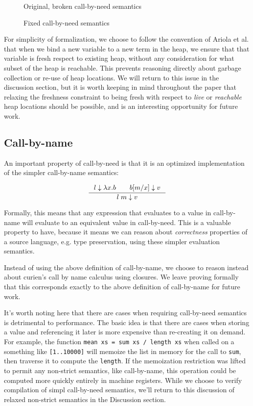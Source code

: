 \begin{figure}

\caption{Original, broken call-by-need semantics}
\label{fig:cbnbroken}
\end{figure}

\begin{figure}

\caption{Fixed call-by-need semantics}
\label{fig:cbnfixed}
\end{figure}

For simplicity of formalization, we choose to follow the convention of Ariola et
al. that when we bind a new variable to a new term in the heap, we ensure that
that variable is fresh respect to existing heap, without any consideration for
what subset of the heap is reachable. This prevents reasoning directly about
garbage collection or re-use of heap locations. We will return to this issue in
the discussion section, but it is worth keeping in mind throughout the paper
that relaxing the freshness constraint to being fresh with respect to
\emph{live} or \emph{reachable} heap locations should be possible, and is an
interesting opportunity for future work. 

\subsection{Call-by-name}
An important property of call-by-need is that it is an optimized implementation of
the simpler call-by-name semantics: 

\begin{align}
\inference{l \downarrow \lambda x. b \quad \quad b [m / x] \downarrow v}{l \; m \downarrow v}
\end{align}

Formally, this means that any expression that evaluates to a value in
call-by-name will evaluate to an equivalent value in call-by-need. This is a
valuable property to have, because it means we can reason about
\emph{correctness} properties of a source language, e.g. type preservation,
using these simpler evaluation semantics. 

Instead of using the above definition of call-by-name, we choose to reason
instead about curien's call by name calculus using closures. We leave proving
formally that this corresponds exactly to the above definition of call-by-name
for future work.

It's worth noting here that there are cases when requiring call-by-need
semantics is detrimental to performance. The basic idea is that there are cases
when storing a value and referencing it later is more expensive than re-creating
it on demand. For example, the function \texttt{mean xs = sum xs / length xs}
when called on a something like \texttt{[1..10000]} will memoize the list in
memory for the call to \texttt{sum}, then traverse it to compute the
\texttt{length}.  If the memoization restriction was lifted to permit any
non-strict semantics, like call-by-name, this operation could be computed more
quickly entirely in machine registers. While we choose to verify compilation of
simpl call-by-need semantics, we'll return to this discussion of relaxed
non-strict semantics in the Discussion section.

